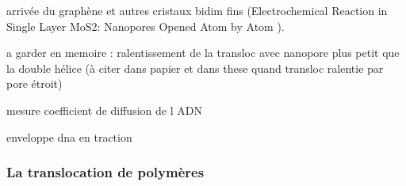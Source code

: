 \documentclass[a4paper,11pt]{article}
\begin{document}
arrivée du graphène et autres cristaux bidim fins (Electrochemical Reaction in Single Layer MoS2: Nanopores Opened Atom by Atom \cite{Feng2015}).








a garder en memoire : ralentissement de la transloc avec nanopore plus petit que la double hélice (à citer dans papier et dans these quand transloc ralentie par pore étroit)\cite{Mirsaidov2010}

mesure coefficient de diffusion de l ADN \cite{Smith1996}

enveloppe dna en traction \cite{Wirtz1995}



\subsubsection{La translocation de polymères}





\newpage
\end{document}
